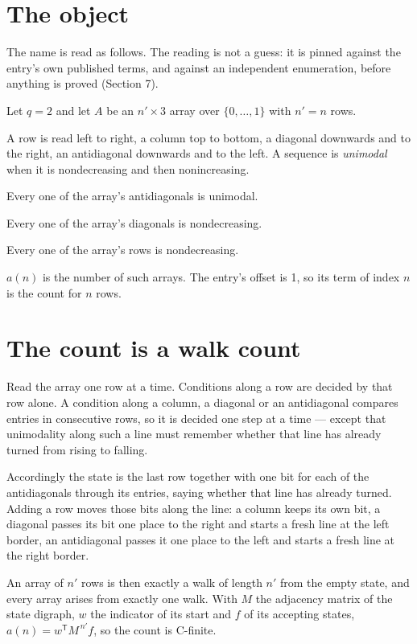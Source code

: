 \documentclass[11pt]{article}
\theoremstyle{definition}
\begin{document}
\section{The object}

The name is read as follows. The reading is not a guess: it is pinned against the entry's own published terms, and against an independent enumeration, before anything is proved (Section 7).

Let $q = 2$ and let $A$ be an $n' \times 3$ array over $\{0,\dots,1\}$ with $n' = n$ rows.

A row is read left to right, a column top to bottom, a diagonal downwards and to the right, an antidiagonal downwards and to the left. A sequence is {\itshape unimodal} when it is nondecreasing and then nonincreasing.

Every one of the array's antidiagonals is unimodal.

Every one of the array's diagonals is nondecreasing.

Every one of the array's rows is nondecreasing.

$a(n)$ is the number of such arrays. The entry's offset is 1, so its term of index $n$ is the count for $n$ rows.

\section{The count is a walk count}

Read the array one row at a time. Conditions along a row are decided by that row alone. A condition along a column, a diagonal or an antidiagonal compares entries in consecutive rows, so it is decided one step at a time --- except that unimodality along such a line must remember whether that line has already turned from rising to falling.

Accordingly the state is the last row together with one bit for each of the antidiagonals through its entries, saying whether that line has already turned. Adding a row moves those bits along the line: a column keeps its own bit, a diagonal passes its bit one place to the right and starts a fresh line at the left border, an antidiagonal passes it one place to the left and starts a fresh line at the right border.

An array of $n'$ rows is then exactly a walk of length $n'$ from the empty state, and every array arises from exactly one walk. With $M$ the adjacency matrix of the state digraph, $w$ the indicator of its start and $f$ of its accepting states, $a(n) = w^{\mathsf T}M^{\,n'}f$, so the count is C-finite.
\end{document}

